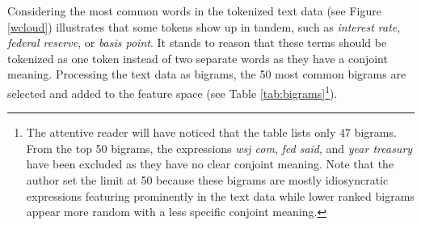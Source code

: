 \documentclass[11pt,a4paper,english,oneside]{book}
\numberwithin{equation}{chapter}
\begin{document}
Considering the most common words in the tokenized text data (see Figure \ref{wcloud}) illustrates that some tokens show up in tandem, such as \textit{interest rate}, \textit{federal reserve}, or \textit{basis point}. It stands to reason that these terms should be tokenized as one token instead of two separate words as they have a conjoint meaning. Processing the text data as bigrams, the 50 most common bigrams are selected and added to the feature space (see Table \ref{tab:bigrams}\footnote{The attentive reader will have noticed that the table lists only 47 bigrams. From the top 50 bigrams, the expressions \textit{wsj com}, \textit{fed said}, and \textit{year treasury} have been excluded as they have no clear conjoint meaning. Note that the author set the limit at 50 because these bigrams are mostly idiosyncratic expressions featuring prominently in the text data while lower ranked bigrams appear more random with a less specific conjoint meaning.}).
\end{document}
